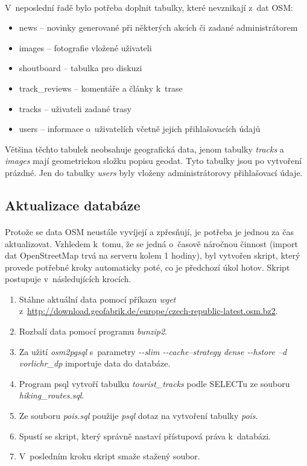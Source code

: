 \documentclass[11pt,a4paper,titlepage,oneside]{book}
\begin{document}
				\paragraph{} V~neposlední řadě bylo potřeba doplnit tabulky, které nevznikají z~dat \acl{OSM}:
					\begin{itemize}
						\item news -- novinky generované při některých akcích či zadané administrátorem
						\item images -- fotografie vložené uživateli
						\item shoutboard -- tabulka pro diskuzi
						\item track\_reviews -- komentáře a články k~trase
						\item tracks -- uživateli zadané trasy
						\item users -- informace o~uživatelích včetně jejich přihlašovacích údajů
					\end{itemize}
Většina těchto tabulek neobsahuje geografická data, jenom tabulky \textit{tracks} a \textit{images} mají geometrickou složku popisu geodat. Tyto tabulky jsou po vytvoření prázdné. Jen do tabulky \textit{users} byly vloženy administrátorovy přihlašovací údaje.
			\subsection{Aktualizace databáze}
				\paragraph{} Protože se data \acl{OSM} neustále vyvíjejí a zpřesňují, je potřeba je jednou za čas aktualizovat. Vzhledem k~tomu, že se jedná o~časově náročnou činnost (import dat OpenStreetMap trvá na serveru kolem 1 hodiny), byl vytvořen skript, který provede potřebné kroky automaticky poté, co je předchozí úkol hotov. Skript postupuje v~následujících krocích.
		\begin{enumerate}
			\item Stáhne aktuální data pomocí příkazu \textit{wget}  z~\url{http://download.geofabrik.de/europe/czech-republic-latest.osm.bz2}.
			\item Rozbalí data pomocí programu \textit{bunzip2}.
			\item Za užití \textit{osm2pgsql} s~parametry \textit{ -\--slim  -\--cache--strategy dense -\--hstore --d vorlichr\_dp} importuje data do databáze.
			\item Program psql vytvoří tabulku \textit{tourist\_tracks} podle SELECTu ze souboru \textit{hiking\_routes.sql}.
			\item Ze souboru \textit{pois.sql} použije \textit{psql} dotaz na vytvoření tabulky \textit{pois}.
			\item Spustí se skript, který správně nastaví přístupová práva k~databázi.
			\item V~posledním kroku skript smaže stažený soubor.
		\end{enumerate}
\end{document}
